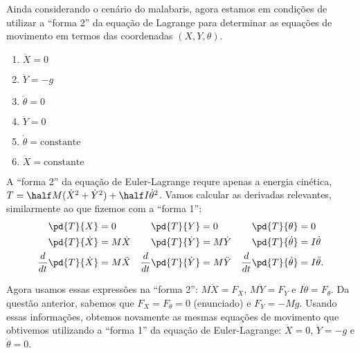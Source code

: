 \begin{question}
  	Ainda considerando o cenário do malabaris, agora estamos em condições de utilizar a ``forma 2'' da equação de Lagrange para determinar as equações de movimento em termos das coordenadas $(X,Y,\theta)$.

  	\begin{enumerate}
  		\item $\ddot X = 0$ \rightanswer
  		\item $\ddot Y = -g$ \rightanswer
  		\item $\ddot\theta = 0$ \rightanswer
  		\item $\ddot Y = 0$
  		\item $\dot\theta = \text{constante}$
  		\item $\dot X = \text{constante}$
  	\end{enumerate}

    \begin{solution}
      A ``forma 2'' da equação de Euler-Lagrange requre apenas a energia cinética, $T = \half M (\dot X^2 + \dot Y^2) + \half I \dot\theta^2$.
      Vamos calcular as derivadas relevantes, similarmente ao que fizemos com a ``forma 1'':
      \begin{align*}
        \pd{T}{X} &= 0
          & \pd{T}{Y} &= 0
            & \pd{T}{\theta} &= 0 \\
        \pd{T}{\dot X} &= M\dot X
          & \pd{T}{\dot Y} &= M\dot Y
            & \pd{T}{\dot \theta} &= I\dot \theta \\
        \frac{d}{dt}\pd{T}{\dot X} &= M\ddot X
          & \frac{d}{dt}\pd{T}{\dot Y} &= M\ddot Y
            & \frac{d}{dt}\pd{T}{\dot \theta} &= I\ddot \theta.
      \end{align*}

      Agora usamos essas expressões na ``forma 2'': $M\dot X = F_X$, $M\dot Y = F_Y$ e $I\dot\theta = F_\theta$.
      Da questão anterior, sabemos que $F_X = F_\theta = 0$ (enunciado) e $F_Y = -Mg$.
      Usando essas informações, obtemos novamente as mesmas equações de movimento que obtivemos utilizando a ``forma 1'' da equação de Euler-Lagrange: $\ddot X = 0$, $\ddot Y = -g$ e $\ddot \theta = 0$.
    \end{solution}
\end{question}